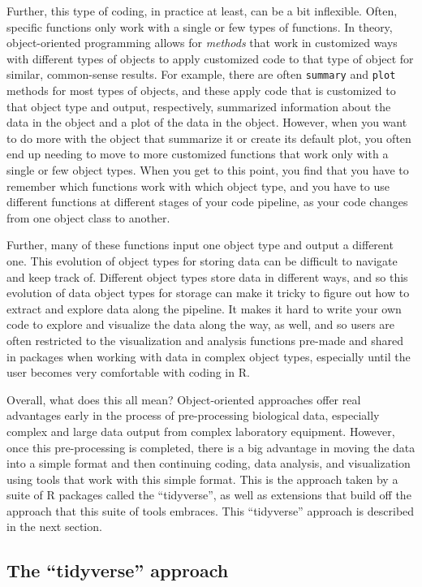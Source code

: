 \documentclass[]{tufte-book}
\begin{document}
Further, this type of coding, in practice at least, can be a bit inflexible.
Often, specific functions only work with a single or few types of functions. In
theory, object-oriented programming allows for \emph{methods} that work in customized
ways with different types of objects to apply customized code to that type of
object for similar, common-sense results. For example, there are often \texttt{summary}
and \texttt{plot} methods for most types of objects, and these apply code that is
customized to that object type and output, respectively, summarized information
about the data in the object and a plot of the data in the object. However, when
you want to do more with the object that summarize it or create its default
plot, you often end up needing to move to more customized functions that work
only with a single or few object types. When you get to this point, you find that
you have to remember which functions work with which object type, and you have to
use different functions at different stages of your code pipeline, as your code
changes from one object class to another.

Further, many of these functions input one object type and output a different
one. This evolution of object types for storing data can be difficult to navigate
and keep track of. Different object types store data in different ways, and so
this evolution of data object types for storage can make it tricky to figure out
how to extract and explore data along the pipeline. It makes it hard to write your
own code to explore and visualize the data along the way, as well, and so users
are often restricted to the visualization and analysis functions pre-made and
shared in packages when working with data in complex object types, especially
until the user becomes very comfortable with coding in R.

Overall, what does this all mean? Object-oriented approaches offer real advantages
early in the process of pre-processing biological data, especially complex and
large data output from complex laboratory equipment. However, once this pre-processing
is completed, there is a big advantage in moving the data into a simple format
and then continuing coding, data analysis, and visualization using tools that
work with this simple format. This is the approach taken by a suite of R packages
called the ``tidyverse'', as well as extensions that build off the approach that
this suite of tools embraces. This ``tidyverse'' approach is described in the
next section.

\hypertarget{the-tidyverse-approach}{%
\subsection{The ``tidyverse'' approach}\label{the-tidyverse-approach}}
\end{document}
